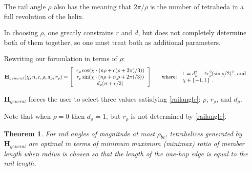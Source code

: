 \documentclass[10pt,final]{journals-1.0/asme2ej}
\newtheorem{theorem}{Theorem}
\renewcommand{\vec}[1]{\mathbf{#1}}
\begin{document}
The rail angle $\rho$ also has the meaning that $2 \pi / \rho$ is the number of
tetraheda in a full revolution of the helix.

In choosing $\rho$, one greatly constrains $r$ and $d$, but does not completely
determine both of them together, so one must treat both as additional parameters.

Rewriting our formulation in terms of $\rho$:
\begin{equation}
  \begin{split}
  \label{eq:general}  
\vec{H}_{general}(\chi,n,c,\rho,d_{\rho},r_{\rho}) =  
 \left [
  \begin{tabular}{c}
   $ r_{\rho} \cos(\chi \cdot (n \rho + c(\rho +  2 \pi) /3)) $\\
   $ r_{\rho}  \sin(\chi \cdot (n \rho + c(\rho +  2 \pi) /3)) $\\
   $ d_{\rho} (n + c /3) $
  \end{tabular}
  \right ] \\
   \end{split}
\text{\qquad where: } 
\begin{tabular}{l}
  $   1 = d_{\rho}^2 + 4 r_{\rho}^2 (\sin{ \rho / 2})^2 $, and \\
    $\chi \in \{-1,1\}$ \text{.} \\  
\end{tabular}
\end{equation}  


$\vec{H}_{general}$ forces the user to select three values satisfying \cref{railangle}: $\rho$, $r_{\rho}$, and $d_{\rho}$.

Note that when $\rho = 0$ then $d_{\rho} = 1$, but $r_{\rho}$ is not determined by
\cref{railangle}.

\begin{theorem}
  \label{generalformulaoptimal}
  For rail angles of magnitude at most $\rho_{bc}$, tetrahelices generated by
  $\vec{H}_{general}$ are optimal in terms of minimum maximum (minimax) ratio of member
  length when radius is chosen so that
  the length of the one-hop edge is equal to the rail length.
\end{theorem}
\end{document}
